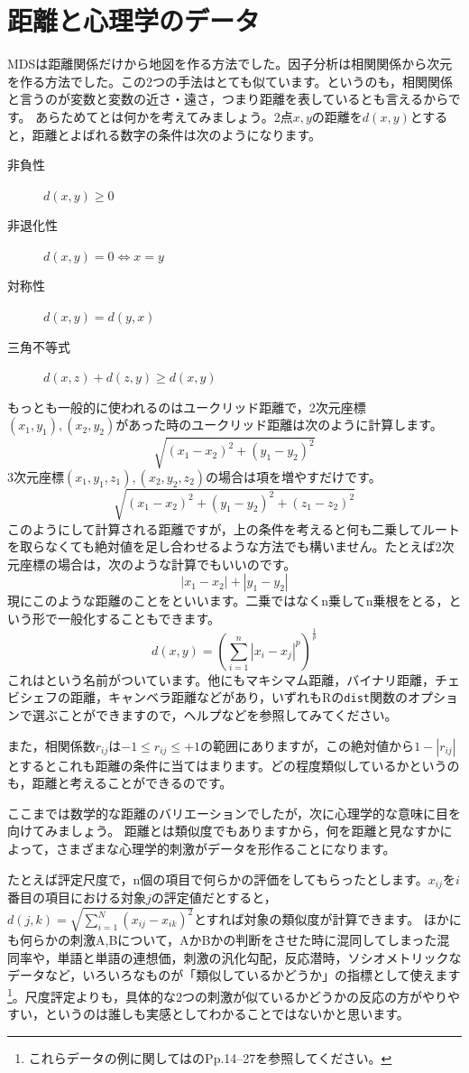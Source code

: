\documentclass{ltjsbook}
\begin{document}
\section{距離と心理学のデータ}
\label{distance}
MDSは距離関係だけから地図を作る方法でした。因子分析は相関関係から次元を作る方法でした。この2つの手法はとても似ています。というのも，相関関係と言うのが変数と変数の近さ・遠さ，つまり距離を表しているとも言えるからです。
あらためてとは何かを考えてみましょう。2点$x,y$の距離を$d(x,y)$とすると，距離とよばれる数字の条件は次のようになります。
\begin{description}
    \item[非負性] $d(x,y)\ge 0$
    \item[非退化性] $d(x,y)=0 \Leftrightarrow x=y$
    \item[対称性] $d(x,y)=d(y,x)$
    \item[三角不等式] $d(x,z) + d(z,y) \ge d(x,y)$
\end{description}
もっとも一般的に使われるのはユークリッド距離で，2次元座標$(x_1,y_1),(x_2,y_2)$があった時のユークリッド距離は次のように計算します。
\[ \sqrt{(x_1-x_2)^2+(y_1-y_2)^2} \]
3次元座標$(x_1,y_1,z_1),(x_2,y_2,z_2)$の場合は項を増やすだけです。
\[ \sqrt{(x_1-x_2)^2+(y_1-y_2)^2+(z_1-z_2)^2} \]
このようにして計算される距離ですが，上の条件を考えると何も二乗してルートを取らなくても絶対値を足し合わせるような方法でも構いません。たとえば2次元座標の場合は，次のような計算でもいいのです。
\[ |x_1-x_2|+|y_1-y_2| \]
現にこのような距離のことをといいます。二乗ではなくn乗してn乗根をとる，という形で一般化することもできます。
\[ d(x,y) = \left( \sum_{i=1}^n |x_i - x_j|^p\right)^{\frac{1}{p}} \]
これはという名前がついています。他にもマキシマム距離，バイナリ距離，チェビシェフの距離，キャンベラ距離などがあり，いずれもRの\texttt{dist}関数のオプションで選ぶことができますので，ヘルプなどを参照してみてください。

また，相関係数$r_{ij}$は$-1 \le r_{ij} \le +1$の範囲にありますが，この絶対値から$1-|r_{ij}|$とするとこれも距離の条件に当てはまります。どの程度類似しているかというのも，距離と考えることができるのです。

ここまでは数学的な距離のバリエーションでしたが，次に心理学的な意味に目を向けてみましょう。
距離とは類似度でもありますから，何を距離と見なすかによって，さまざまな心理学的刺激がデータを形作ることになります。

たとえば評定尺度で，n個の項目で何らかの評価をしてもらったとします。$x_{ij}$を$i$番目の項目における対象$j$の評定値だとすると，
$d(j,k) = \sqrt{\sum_{i=1}^N (x_{ij}-x_{ik})^2 }$とすれば対象の類似度が計算できます。
ほかにも何らかの刺激A,Bについて，AかBかの判断をさせた時に混同してしまった混同率や，単語と単語の連想価，刺激の汎化勾配，反応潜時，ソシオメトリックなデータなど，いろいろなものが「類似しているかどうか」の指標として使えます\footnote{これらデータの例に関しては\citet{Takane198002}のPp.14--27を参照してください。}。尺度評定よりも，具体的な2つの刺激が似ているかどうかの反応の方がやりやすい，というのは誰しも実感としてわかることではないかと思います。
\end{document}
